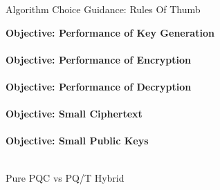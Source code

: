 \begin{minipage}[t]{0.7\textwidth}
\begin{algorithmbox}{Algorithm Choice Guidance: Rules Of Thumb}
\begin{minipage}[t]{0.5\textwidth}
            {\scriptsize \bfseries Objective: Performance of Key Generation \tbv}\\[0.1\baselineskip]
            \\[0.75\baselineskip]
            {\scriptsize \bfseries Objective: Performance of Encryption \tbv}\\[0.1\baselineskip]
            \\[0.75\baselineskip]
            {\scriptsize \bfseries Objective: Performance of Decryption \tbv}\\[0.1\baselineskip]
            \\[0.75\baselineskip]
            {\scriptsize \bfseries Objective: Small Ciphertext \tbv}\\[0.1\baselineskip]
            \\[0.75\baselineskip]
            {\scriptsize \bfseries Objective: Small Public Keys \tbv}\\[0.1\baselineskip]
            \\[0.75\baselineskip]
        \end{minipage}
    \end{algorithmbox}
    \vfill
    \begin{algorithmbox}{Pure PQC vs PQ/T Hybrid}
        \scriptsize

\end{algorithmbox}
\end{minipage}
